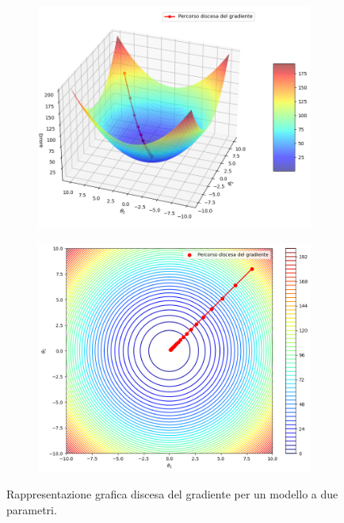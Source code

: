 \documentclass[12pt,a4paper,twoside,openright]{book}
\begin{document}
\begin{figure}
    \centering
    \begin{subfigure}[b]{0.48\textwidth}
        \includegraphics[width=\textwidth]{images/gradiente.png}
    \end{subfigure}
\quad
    \begin{subfigure}[b]{0.48\textwidth}
        \includegraphics[width=\textwidth]{images/gradiente2.png}
    \end{subfigure}
    \caption{Rappresentazione grafica discesa del gradiente per un modello a due parametri.}
    \label{fig:grad-descent}
\end{figure}
\end{document}
